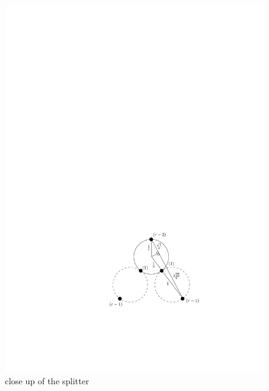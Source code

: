 \documentclass[11pt]{article}
\begin{document}
\begin{figure}[htbp]
\begin{center}
\includegraphics[scale=.9]{figs/splitter}
\caption{close up of the splitter}
\label{fig:splitter}
\end{center}
\end{figure}
\end{document}
